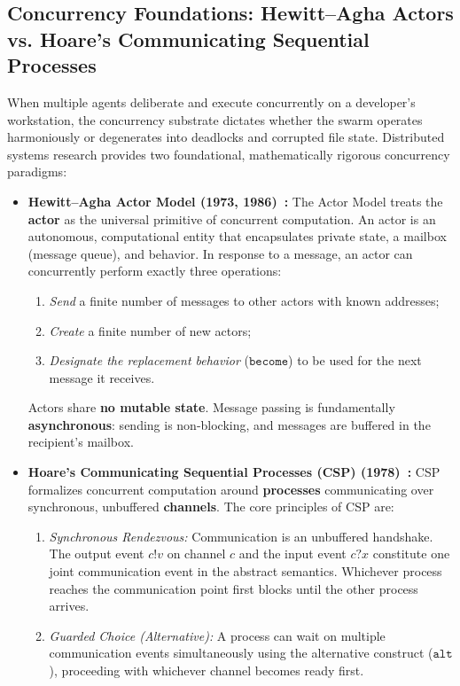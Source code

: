 \subsection{Concurrency Foundations: Hewitt--Agha Actors vs. Hoare's Communicating Sequential Processes}

When multiple agents deliberate and execute concurrently on a developer's workstation, the concurrency substrate dictates whether the swarm operates harmoniously or degenerates into deadlocks and corrupted file state. Distributed systems research provides two foundational, mathematically rigorous concurrency paradigms:

\begin{itemize}[leftmargin=1.8em,itemsep=3pt]
  \item \textbf{Hewitt--Agha Actor Model (1973, 1986)~:}\enspace
  The Actor Model treats the \textbf{actor} as the universal primitive of concurrent computation. An actor is an autonomous, computational entity that encapsulates private state, a mailbox (message queue), and behavior. In response to a message, an actor can concurrently perform exactly three operations:
  \begin{enumerate}[leftmargin=1.5em,itemsep=1.5pt]
    \item \emph{Send} a finite number of messages to other actors with known addresses;
    \item \emph{Create} a finite number of new actors;
    \item \emph{Designate the replacement behavior} ($\mathtt{become}$) to be used for the next message it receives.
  \end{enumerate}
  Actors share \textbf{no mutable state}. Message passing is fundamentally \textbf{asynchronous}: sending is non-blocking, and messages are buffered in the recipient's mailbox.

  \item \textbf{Hoare's Communicating Sequential Processes (CSP) (1978)~:}\enspace
  CSP formalizes concurrent computation around \textbf{processes} communicating over synchronous, unbuffered \textbf{channels}. The core principles of CSP are:
  \begin{enumerate}[leftmargin=1.5em,itemsep=1.5pt]
    \item \emph{Synchronous Rendezvous:} Communication is an unbuffered handshake. The output event $c!v$ on channel $c$ and the input event $c?x$ constitute one joint communication event in the abstract semantics. Whichever process reaches the communication point first blocks until the other process arrives.
    \item \emph{Guarded Choice (Alternative):} A process can wait on multiple communication events simultaneously using the alternative construct ($\mathtt{alt}$), proceeding with whichever channel becomes ready first.
  \end{enumerate}
\end{itemize}

